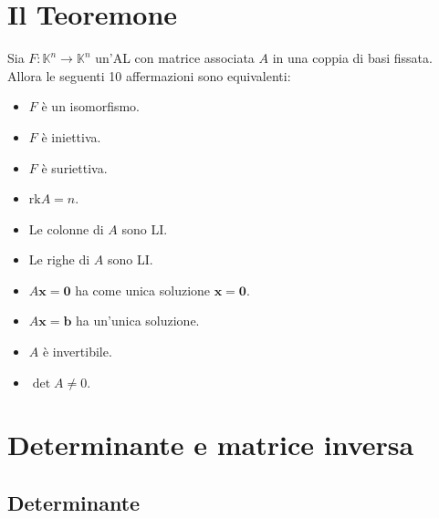 \documentclass[]{article}
\newcommand{\bl}[1]{\mathbf{#1}}
\theoremstyle{definition}
\theoremstyle{definition}
\theoremstyle{definition}
\begin{document}
\section{Il Teoremone}
Sia $F:\mathbb{K}^n \to \mathbb{K}^n$ un'AL con matrice associata $A$ in una coppia di basi fissata. Allora le seguenti 10 affermazioni sono equivalenti:
\begin{itemize}
\item $F$ è un isomorfismo.
\item $F$ è iniettiva.
\item $F$ è suriettiva.
\item $\mathrm{rk}A=n$.
\item Le colonne di $A$ sono LI.
\item Le righe di $A$ sono LI.
\item $A \bl{x}= \bl{0}$ ha come unica soluzione $\bl{x}=\bl{0}$.
\item $A \bl{x}= \bl{b}$ ha un'unica soluzione.
\item $A$ è invertibile.
\item $\det A \neq 0$.
\end{itemize}


\section{Determinante e matrice inversa}
\subsection{Determinante} 
\end{document}
